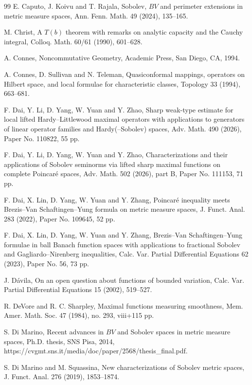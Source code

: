 \documentclass[11pt]{amsart}
\theoremstyle{definition}
\theoremstyle{remark}
\numberwithin{equation}{section}
\begin{document}
\begin{thebibliography}{99}
E. Caputo, J. Koivu and T. Rajala,
Sobolev, $BV$ and perimeter extensions in metric measure spaces,
Ann. Fenn. Math. 49 (2024), 135--165.


M. Christ,
A $T(b)$ theorem with remarks on analytic capacity and the Cauchy integral,
Colloq. Math. 60/61 (1990), 601--628.


A. Connes,
Noncommutative Geometry,
Academic Press, San Diego, CA, 1994.


A. Connes, D. Sullivan and N. Teleman,
Quasiconformal mappings, operators on Hilbert space, and local formulae for characteristic
classes,
Topology 33 (1994), 663--681.


F. Dai, Y. Li, D. Yang, W. Yuan and Y. Zhao,
Sharp weak-type estimate for local lifted Hardy--Littlewood maximal operators with
applications
to generators of linear operator families and Hardy(--Sobolev) spaces,
Adv. Math. 490 (2026), Paper No. 110822, 55 pp.


F. Dai, Y. Li, D. Yang, W. Yuan and Y. Zhao,
Characterizations and their applications of Sobolev seminorms via lifted sharp maximal
functions
on complete Poincar\'e spaces,
Adv. Math. 502 (2026), part B, Paper No. 111153, 71 pp.


F. Dai, X. Lin, D. Yang, W. Yuan and Y. Zhang,
Poincar\'e inequality meets Brezis--Van Schaftingen--Yung formula on metric measure spaces,
J. Funct. Anal. 283 (2022), Paper No. 109645, 52 pp.


F. Dai, X. Lin, D. Yang, W. Yuan and Y. Zhang,
Brezis--Van Schaftingen--Yung formulae in ball Banach function spaces with applications to
fractional Sobolev and Gagliardo--Nirenberg inequalities,
Calc. Var. Partial Differential Equations 62 (2023), Paper No. 56, 73 pp.


J. D\'avila,
On an open question about functions of bounded variation,
Calc. Var. Partial Differential Equations 15 (2002), 519--527.


R. DeVore and R. C. Sharpley,
Maximal functions measuring smoothness,
Mem. Amer. Math. Soc. 47 (1984), no. 293, viii+115 pp.


S. Di Marino,
Recent advances in $BV$ and Sobolev spaces in metric measure spaces,
Ph.D. thesis, SNS Pisa, 2014,
https://cvgmt.sns.it/media/doc/paper/2568/thesis\_final.pdf.


S. Di Marino and M. Squassina,
New characterizations of Sobolev metric spaces,
J. Funct. Anal. 276 (2019), 1853--1874.



\end{thebibliography}
\end{document}
